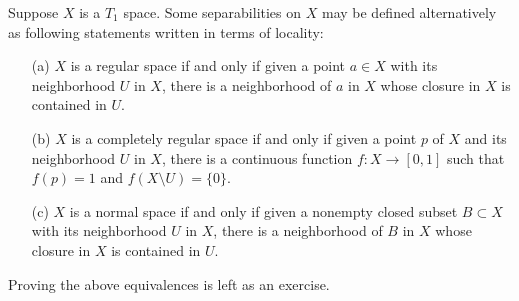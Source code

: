 \begin{rmk}
    Suppose $X$ is a $T_1$ space.
    Some separabilities on $X$ may be defined alternatively as following statements written in terms of locality:
    \begin{enumerate}
        \item[(a)]
        {
            $X$ is a regular space if and only if given a point $a\in X$ with its neighborhood $U$ in $X$, there is a neighborhood of $a$ in $X$ whose closure in $X$ is contained in $U$.
        }
        \item[(b)]
        {
            $X$ is a completely regular space if and only if given a point $p$ of $X$ and its neighborhood $U$ in $X$, there is a continuous function $f: X\rightarrow[0, 1]$ such that $f(p)=1$ and $f(X\setminus U)=\{0\}$.
        }
        \item[(c)]
        {
            $X$ is a normal space if and only if given a nonempty closed subset $B\subset X$ with its neighborhood $U$ in $X$, there is a neighborhood of $B$ in $X$ whose closure in $X$ is contained in $U$.
        }
    \end{enumerate}
    \color{brown}Proving the above equivalences is left as an exercise.\color{black}
\end{rmk}

